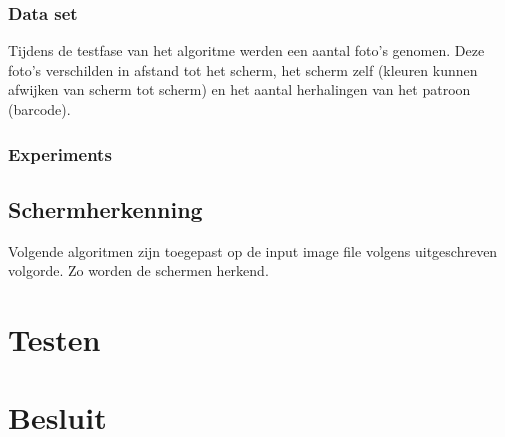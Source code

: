 \documentclass[a4paper,11pt]{article}
\begin{document}
\subsubsection{Data set}

Tijdens de testfase van het algoritme werden een aantal foto's genomen. Deze foto's verschilden in afstand tot het scherm, het scherm zelf (kleuren kunnen afwijken van scherm tot scherm) en het aantal herhalingen van het patroon (barcode).

\subsubsection{Experiments}\label{sec:experimenten}

\subsection{Schermherkenning}
Volgende algoritmen zijn toegepast op de input image file volgens uitgeschreven volgorde. Zo worden de schermen herkend.


\section{Testen}

\section{Besluit}\label{sec:besluit}




\end{document}

